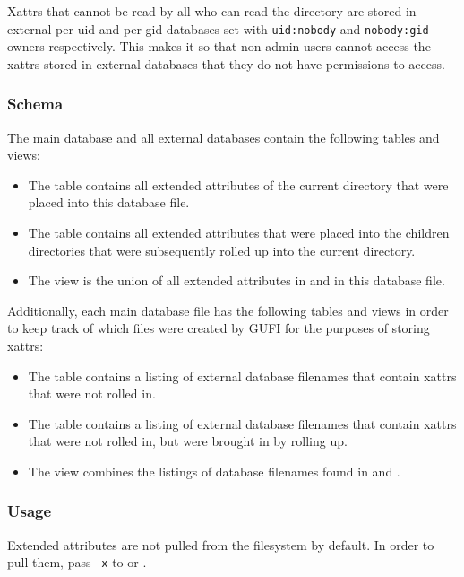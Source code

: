 Xattrs that cannot be read by all who can read the directory are
stored in external per-uid and per-gid databases set with
\texttt{uid:nobody} and \texttt{nobody:gid} owners respectively. This
makes it so that non-admin users cannot access the xattrs stored in
external databases that they do not have permissions to access.

\subsubsection{Schema}
\label{sec:xattr_schema}
The main database and all external databases contain the following
tables and views:

\begin{itemize}
\item The \xattrspwd table contains all extended attributes of the
  current directory that were placed into this database file.

\item The \xattrsrollup table contains all extended attributes that
  were placed into the children directories that were subsequently
  rolled up into the current directory.

\item The \xattrsavail view is the union of all extended attributes
  in \xattrspwd and \xattrsrollup in this database file.
\end{itemize}

Additionally, each main database file has the following tables and
views in order to keep track of which files were created by GUFI for
the purposes of storing xattrs:

\begin{itemize}
\item The \xattrfilespwd table contains a listing of external database
  filenames that contain xattrs that were not rolled in.
\item The \xattrfilesrollup table contains a listing of external
  database filenames that contain xattrs that were not
  rolled in, but were brought in by rolling up.
\item The \xattrfiles view combines the listings of database filenames
  found in \xattrfilespwd and \xattrfilesrollup.
\end{itemize}

\subsubsection{Usage}
Extended attributes are not pulled from the filesystem by default. In
order to pull them, pass \texttt{-x} to \gufidirindex or
\gufidirtrace.

